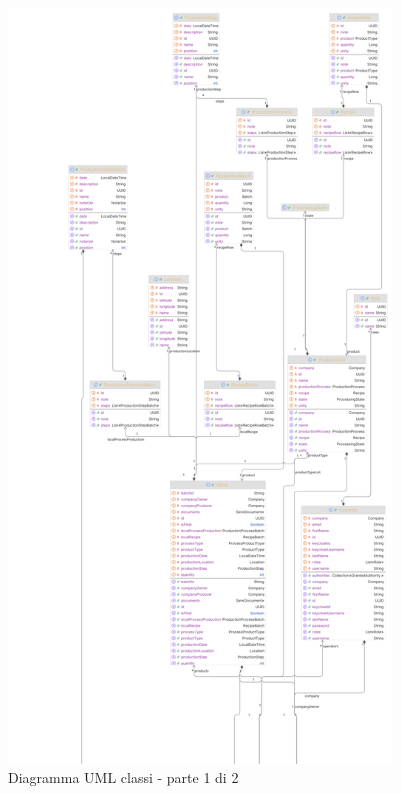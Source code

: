 \documentclass[a4paper,11pt]{article}
\begin{document}
\begin{figure}[H]
  \includegraphics[height=20cm]{img/model3_up.png}
  \caption{Diagramma UML classi - parte 1 di 2}
  \label{fig:schemaclassi1}
\end{figure}
\end{document}
